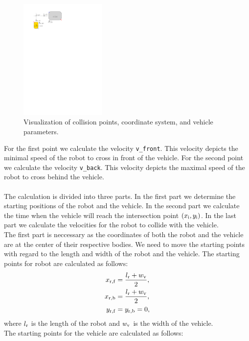         \begin{figure}[ht]
            \centering
            \includegraphics[height=6cm]{images/collision.pdf}
            \caption{Visualization of collision points, coordinate system, and vehicle parameters.}
            \label{fig:collision}
        \end{figure}
        \noindent For the first point we calculate the velocity \texttt{v\_front}. This velocity depicts the minimal speed of the robot to cross in front of the vehicle. For the second point we calculate the velocity \texttt{v\_back}. This velocity depicts the maximal speed of the robot to cross behind the vehicle.\\\\
        The calculation is divided into three parts. In the first part we determine the starting positions of the robot and the vehicle. In the second part we calculate the time when the vehicle will reach the intersection point $(x_{\rm{i}}, y_{\rm{i}})$. In the last part we calculate the velocities for the robot to collide with the vehicle.\\
        The first part is neccessary as the coordinates of both the robot and the vehicle are at the center of their respective bodies. We need to move the starting points with regard to the length and width of the robot and the vehicle. The starting points for robot are calculated as follows:
        \begin{align}
            x_{\rm{r,f}} &= \frac{l_{\rm{r}}+w_{\rm{v}}}{2},\\
            x_{\rm{r,b}} &= \frac{l_{\rm{r}}+w_{\rm{v}}}{2},\\
            y_{\rm{r,f}} &= y_{\rm{r,b}} = 0,
        \end{align}
        where $l_{\rm{r}}$ is the length of the robot and $w_{\rm{v}}$ is the width of the vehicle.\\
        The starting points for the vehicle are calculated as follows:
